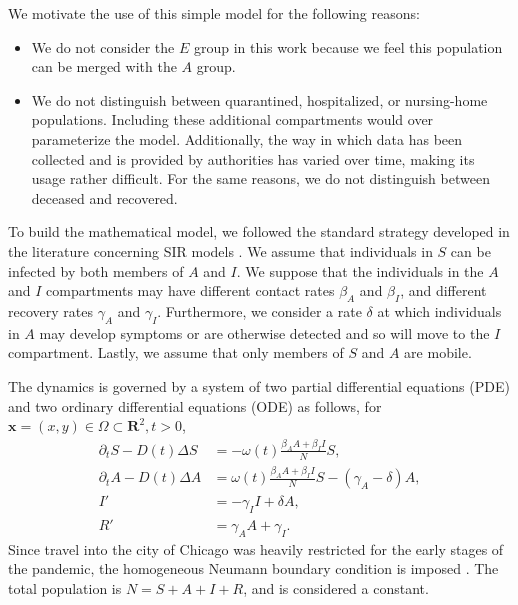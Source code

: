 \documentclass[11pt]{article}
\newcommand{\R}{\mathbf{R}}
\renewcommand\vec{\mathbf}
\begin{document}
		We motivate the use of this simple model for the following reasons:
		\begin{itemize}
			\item
				We do not consider the $E$ group in this work because we feel this population can be merged with the $A$ group.
			\item
				We do not distinguish between quarantined, hospitalized, or nursing-home populations.
				Including these additional compartments would over parameterize the model.
				Additionally, the way in which data has been collected and is provided by authorities has varied over time, making its usage rather difficult.
				For the same reasons, we do not distinguish between deceased and recovered.
		\end{itemize}
	
		To build the mathematical model, we followed the standard strategy developed in the literature concerning SIR models \cite{bio-models}.
		We assume that individuals in $S$ can be infected by both members of $A$ and $I$.
		We suppose that the individuals in the $A$ and $I$ compartments may have different contact rates $\beta_A$ and $\beta_I$, and different recovery rates $\gamma_A$ and $\gamma_I$.
		Furthermore, we consider a rate $\delta$ at which individuals in $A$ may develop symptoms or are otherwise detected and so will move to the $I$ compartment.
		Lastly, we assume that only members of $S$ and $A$ are mobile.
		
		The dynamics is governed by a system of two partial differential equations (PDE) and two ordinary differential equations (ODE) as follows, for $\vec{x} = (x,y) \in \Omega \subset \R^2, t > 0$,
		\begin{equation} \label{eq:model}
			\begin{aligned}
				\partial_t S - D(t) \Delta S &= - \omega(t) \frac{\beta_A A + \beta_I I}{N} S, \\
				\partial_t A - D(t) \Delta A &= \omega(t) \frac{\beta_A A + \beta_I I}{N} S - (\gamma_A - \delta) A, \\
				I' &= - \gamma_I I + \delta A, \\
				R' &= \gamma_A A + \gamma_I.
			\end{aligned}
		\end{equation}
		Since travel into the city of Chicago was heavily restricted for the early stages of the pandemic, the homogeneous Neumann boundary condition is imposed \cite{Mammeri+2020+102+113}.
		The total population is $N = S + A + I + R$, and is considered a constant.
	
\end{document}
